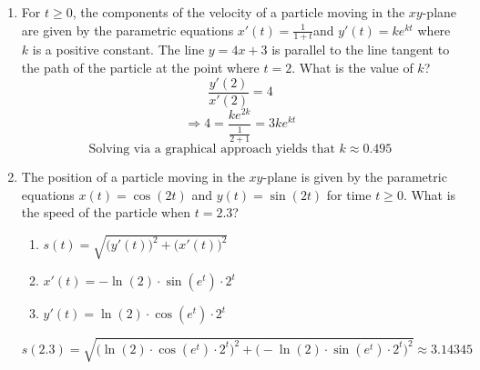 \documentclass[12pt]{article}
\begin{document}
\begin{enumerate}
        \item For $t \geq 0$, the components of the velocity of a particle moving in the $xy$-plane are given by the parametric equations $x'(t)=\frac{1}{1+t}$and $y'(t)=ke^{kt}$ where $k$ is a positive constant. The line $y=4x+3$ is parallel to the line tangent to the path of the particle at the point where $t=2$. What is the value of $k$?
        $$\frac{y'(2)}{x'(2)} = 4$$
        $$\Longrightarrow 4 = \frac{ke^{2k}}{\frac{1}{2+1}} = 3ke^{kt}$$
        $$\text{Solving via a graphical approach yields that } \boxed{k \approx  0.495}$$
        \item The position of a particle moving in the $xy$-plane is given by the parametric equations $x(t) = \cos(2t)$ and $y(t) = \sin(2t)$ for time $t \geq 0$. What is the speed of the particle when $t = 2.3$?
        \begin{enumerate}
            \item $s(t) = \sqrt{\big(y'(t)\big)^2 + \big(x'(t)\big)^2}$
            \item $x'(t)= -\ln (2) \cdot \sin(e^t) \cdot 2^t$
            \item $y'(t)= \ln (2) \cdot \cos(e^t) \cdot 2^t$
        \end{enumerate}
        $$s(2.3)= \sqrt{\big(\ln (2) \cdot \cos(e^t) \cdot 2^t\bigg)^2 + \big(-\ln (2) \cdot \sin(e^t) \cdot 2^t\big)^2} \approx \boxed{3.14345}$$
    \end{enumerate}
\end{document}
